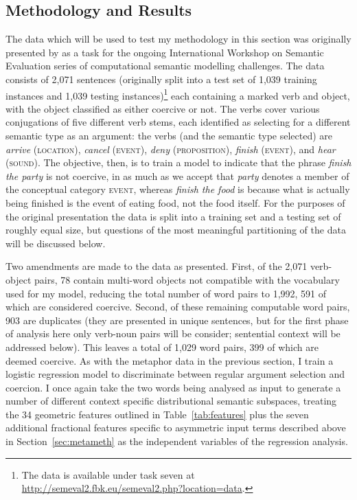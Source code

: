 \subsection{Methodology and Results}
The data which will be used to test my methodology in this section was originally presented by \cite{PustejovskyEA2010} as a task for the ongoing International Workshop on Semantic Evaluation series of computational semantic modelling challenges.  The data consists of 2,071 sentences (originally split into a test set of 1,039 training instances and 1,039 testing instances)\footnote{The data is available under task seven at \url{http://semeval2.fbk.eu/semeval2.php?location=data}.} each containing a marked verb and object, with the object classified as either coercive or not.  The verbs cover various conjugations of five different verb stems, each identified as selecting for a different semantic type as an argument: the verbs (and the semantic type selected) are \emph{arrive} (\textsc{location}), \emph{cancel} (\textsc{event}), \emph{deny} (\textsc{proposition}), \emph{finish} (\textsc{event}), and \emph{hear} (\textsc{sound}).  The objective, then, is to train a model to indicate that the phrase \emph{finish the party} is not coercive, in as much as we accept that \emph{party} denotes a member of the conceptual category \textsc{event}, whereas \emph{finish the food} is because what is actually being finished is the event of eating food, not the food itself.  For the purposes of the original presentation the data is split into a training set and a testing set of roughly equal size, but questions of the most meaningful partitioning of the data will be discussed below.

Two amendments are made to the data as presented.  First, of the 2,071 verb-object pairs, 78 contain multi-word objects not compatible with the vocabulary used for my model, reducing the total number of word pairs to 1,992, 591 of which are considered coercive.  Second, of these remaining computable word pairs, 903 are duplicates (they are presented in unique sentences, but for the first phase of analysis here only verb-noun pairs will be consider; sentential context will be addressed below).  This leaves a total of 1,029 word pairs, 399 of which are deemed coercive.  As with the metaphor data in the previous section, I train a logistic regression model to discriminate between regular argument selection and coercion.  I once again take the two words being analysed as input to generate a number of different context specific distributional semantic subspaces, treating the 34 geometric features outlined in Table~\ref{tab:features} plus the seven additional fractional features specific to asymmetric input terms described above in Section~\ref{sec:metameth} as the independent variables of the regression analysis.

